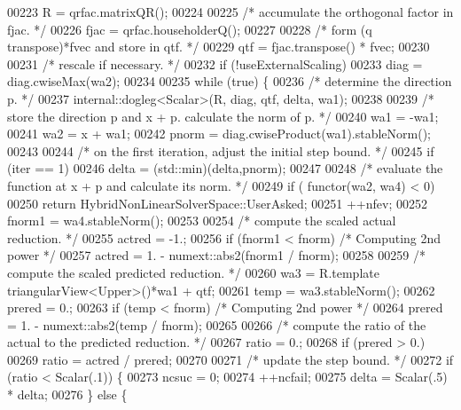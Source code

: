 \begin{DoxyCode}
00223     R = qrfac.matrixQR();
00224 
00225     \textcolor{comment}{/* accumulate the orthogonal factor in fjac. */}
00226     fjac = qrfac.householderQ();
00227 
00228     \textcolor{comment}{/* form (q transpose)*fvec and store in qtf. */}
00229     qtf = fjac.transpose() * fvec;
00230 
00231     \textcolor{comment}{/* rescale if necessary. */}
00232     \textcolor{keywordflow}{if} (!useExternalScaling)
00233         diag = diag.cwiseMax(wa2);
00234 
00235     \textcolor{keywordflow}{while} (\textcolor{keyword}{true}) \{
00236         \textcolor{comment}{/* determine the direction p. */}
00237         internal::dogleg<Scalar>(R, diag, qtf, delta, wa1);
00238 
00239         \textcolor{comment}{/* store the direction p and x + p. calculate the norm of p. */}
00240         wa1 = -wa1;
00241         wa2 = x + wa1;
00242         pnorm = diag.cwiseProduct(wa1).stableNorm();
00243 
00244         \textcolor{comment}{/* on the first iteration, adjust the initial step bound. */}
00245         \textcolor{keywordflow}{if} (iter == 1)
00246             delta = (std::min)(delta,pnorm);
00247 
00248         \textcolor{comment}{/* evaluate the function at x + p and calculate its norm. */}
00249         \textcolor{keywordflow}{if} ( functor(wa2, wa4) < 0)
00250             \textcolor{keywordflow}{return} HybridNonLinearSolverSpace::UserAsked;
00251         ++nfev;
00252         fnorm1 = wa4.stableNorm();
00253 
00254         \textcolor{comment}{/* compute the scaled actual reduction. */}
00255         actred = -1.;
00256         \textcolor{keywordflow}{if} (fnorm1 < fnorm) \textcolor{comment}{/* Computing 2nd power */}
00257             actred = 1. - numext::abs2(fnorm1 / fnorm);
00258 
00259         \textcolor{comment}{/* compute the scaled predicted reduction. */}
00260         wa3 = R.template triangularView<Upper>()*wa1 + qtf;
00261         temp = wa3.stableNorm();
00262         prered = 0.;
00263         \textcolor{keywordflow}{if} (temp < fnorm) \textcolor{comment}{/* Computing 2nd power */}
00264             prered = 1. - numext::abs2(temp / fnorm);
00265 
00266         \textcolor{comment}{/* compute the ratio of the actual to the predicted reduction. */}
00267         ratio = 0.;
00268         \textcolor{keywordflow}{if} (prered > 0.)
00269             ratio = actred / prered;
00270 
00271         \textcolor{comment}{/* update the step bound. */}
00272         \textcolor{keywordflow}{if} (ratio < Scalar(.1)) \{
00273             ncsuc = 0;
00274             ++ncfail;
00275             delta = Scalar(.5) * delta;
00276         \} \textcolor{keywordflow}{else} \{

\end{DoxyCode}
